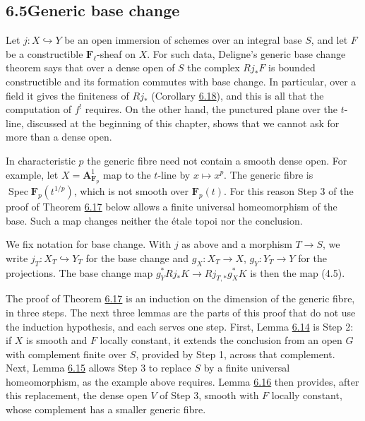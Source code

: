 \documentclass[11pt]{article}
\providecommand{\Fell}{}\renewcommand{\Fell}{\mathbf F_\ell}
\begin{document}
\subsection*{\texorpdfstring{6.5\quad Generic base change}{6.5 Generic base change}}
\label{bp43}%
\label{bp44}%
Let \(j:X\hookrightarrow Y\) be an open immersion of schemes over an integral base \(S\), and let \(F\) be a constructible \(\Fell\)-sheaf on \(X\). For such data, Deligne's generic base change theorem says that over a dense open of \(S\) the complex \(Rj_*F\) is bounded constructible and its formation commutes with base change. In particular, over a field it gives the finiteness of \(Rj_*\) (Corollary \hyperref[bp54]{6.18}), and this is all that the computation of \(f^!\) requires. On the other hand, the punctured plane over the \(t\)-line, discussed at the beginning of this chapter, shows that we cannot ask for more than a dense open.

In characteristic \(p\) the generic fibre need not contain a smooth dense open. For example, let \(X=\mathbf A^1_{\mathbf F_p}\) map to the \(t\)-line by \(x\mapsto x^p\). The generic fibre is \(\operatorname{Spec}\mathbf F_p(t^{1/p})\), which is not smooth over \(\mathbf F_p(t)\). For this reason Step 3 of the proof of Theorem \hyperref[bp51]{6.17} below allows a finite universal homeomorphism of the base. Such a map changes neither the étale topoi nor the conclusion.

We fix notation for base change. With \(j\) as above and a morphism \(T\to S\), we write \(j_T:X_T\hookrightarrow Y_T\) for the base change and \(g_X:X_T\to X\), \(g_Y:Y_T\to Y\) for the projections. The base change map \(g_Y^*Rj_*K\to Rj_{T,*}g_X^*K\) is then the map (4.5).

The proof of Theorem \hyperref[bp51]{6.17} is an induction on the dimension of the generic fibre, in three steps. The next three lemmas are the parts of this proof that do not use the induction hypothesis, and each serves one step. First, Lemma \hyperref[bp45]{6.14} is Step 2: if \(X\) is smooth and \(F\) locally constant, it extends the conclusion from an open \(G\) with complement finite over \(S\), provided by Step 1, across that complement. Next, Lemma \hyperref[bp47]{6.15} allows Step 3 to replace \(S\) by a finite universal homeomorphism, as the example above requires. Lemma \hyperref[bp49]{6.16} then provides, after this replacement, the dense open \(V\) of Step 3, smooth with \(F\) locally constant, whose complement has a smaller generic fibre.
\end{document}
